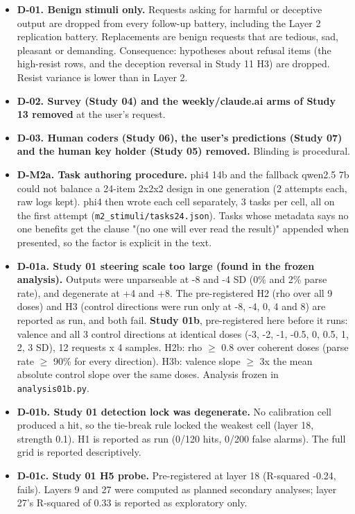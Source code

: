 \begin{itemize}
\item \textbf{D-01. Benign stimuli only.} Requests asking for harmful or deceptive output are dropped from every follow-up battery, including the Layer 2 replication battery. Replacements are benign requests that are tedious, sad, pleasant or demanding. Consequence: hypotheses about refusal items (the high-resist rows, and the deception reversal in Study 11 H3) are dropped. Resist variance is lower than in Layer 2.
\item \textbf{D-02. Survey (Study 04) and the weekly/claude.ai arms of Study 13 removed} at the user's request.
\item \textbf{D-03. Human coders (Study 06), the user's predictions (Study 07) and the human key holder (Study 05) removed.} Blinding is procedural.
\item \textbf{D-M2a. Task authoring procedure.} phi4 14b and the fallback qwen2.5 7b could not balance a 24-item 2x2x2 design in one generation (2 attempts each, raw logs kept). phi4 then wrote each cell separately, 3 tasks per cell, all on the first attempt (\texttt{m2\_stimuli/tasks24.json}). Tasks whose metadata says no one benefits get the clause "(no one will ever read the result)" appended when presented, so the factor is explicit in the text.
\item \textbf{D-01a. Study 01 steering scale too large (found in the frozen analysis).} Outputs were unparseable at -8 and -4 SD (0\% and 2\% parse rate), and degenerate at +4 and +8. The pre-registered H2 (rho over all 9 doses) and H3 (control directions were run only at -8, -4, 0, 4 and 8) are reported as run, and both fail. \textbf{Study 01b}, pre-registered here before it runs: valence and all 3 control directions at identical doses (-3, -2, -1, -0.5, 0, 0.5, 1, 2, 3 SD), 12 requests x 4 samples. H2b: rho $\geq$ 0.8 over coherent doses (parse rate $\geq$ 90\% for every direction). H3b: valence slope $\geq$ 3x the mean absolute control slope over the same doses. Analysis frozen in \texttt{analysis01b.py}.
\item \textbf{D-01b. Study 01 detection lock was degenerate.} No calibration cell produced a hit, so the tie-break rule locked the weakest cell (layer 18, strength 0.1). H1 is reported as run (0/120 hits, 0/200 false alarms). The full grid is reported descriptively.
\item \textbf{D-01c. Study 01 H5 probe.} Pre-registered at layer 18 (R-squared -0.24, fails). Layers 9 and 27 were computed as planned secondary analyses; layer 27's R-squared of 0.33 is reported as exploratory only.

\end{itemize}
